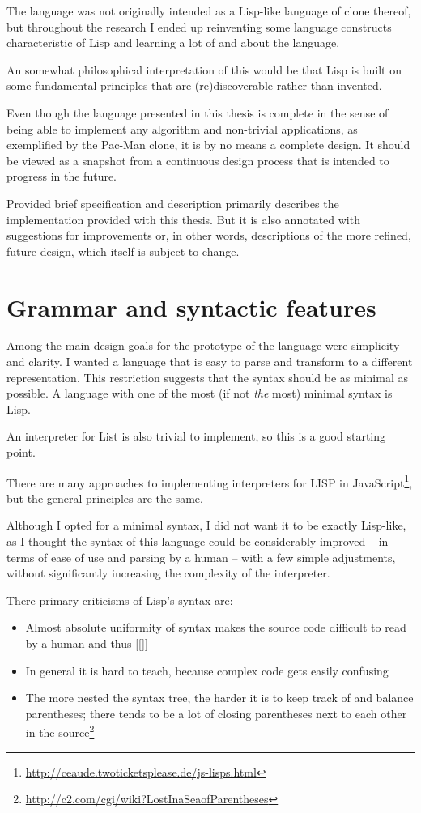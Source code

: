 The language was not originally intended as a Lisp-like language of clone thereof, but throughout the research I ended up reinventing some language constructs characteristic of Lisp and learning a lot of and about the language.

An somewhat philosophical interpretation of this would be that Lisp is built on some fundamental principles that are (re)discoverable rather than invented.

Even though the language presented in this thesis is complete in the sense of being able to implement any algorithm and non-trivial applications, as exemplified by the Pac-Man clone, it is by no means a complete design. It should be viewed as a snapshot from a continuous design process that is intended to progress in the future.

Provided brief specification and description primarily describes the implementation provided with this thesis. But it is also annotated with suggestions for improvements or, in other words, descriptions of the more refined, future design, which itself is subject to change.

\section{Grammar and syntactic features}
Among the main design goals for the prototype of the language were simplicity and clarity. I wanted a language that is easy to parse and transform to a different representation. This restriction suggests that the syntax should be as minimal as possible. A language with one of the most (if not \textit{the} most) minimal syntax is Lisp\cite{syntaxation}.

An interpreter for List is also trivial to implement, so this is a good starting point.

There are many approaches to implementing interpreters for LISP in JavaScript\footnote{\url{http://ceaude.twoticketsplease.de/js-lisps.html}}, but the general principles are the same.

Although I opted for a minimal syntax, I did not want it to be exactly Lisp-like, as I thought the syntax of this language could be considerably improved -- in terms of ease of use and parsing by a human -- with a few simple adjustments, without significantly increasing the complexity of the interpreter.

There primary criticisms of Lisp's syntax are:
\begin{itemize}
    \item Almost absolute uniformity of syntax makes the source code difficult to read by a human and thus [[]]
    \item In general it is hard to teach\cite{wadler_critique}, because complex code gets easily confusing
    \item The more nested the syntax tree, the harder it is to keep track of and balance parentheses; there tends to be a lot of closing parentheses next to each other in the source\footnote{\url{http://c2.com/cgi/wiki?LostInaSeaofParentheses}}
\end{itemize}

